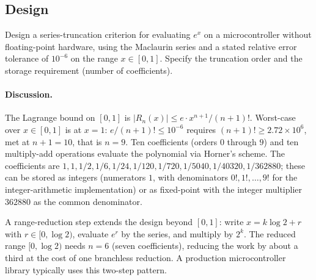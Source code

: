 \subsection*{Design}

\begin{exercise}
Design a series-truncation criterion for evaluating $e^{x}$ on a
microcontroller without floating-point hardware, using the Maclaurin
series and a stated relative error tolerance of $10^{-6}$ on the
range $x \in [0, 1]$. Specify the truncation order and the storage
requirement (number of coefficients).

\paragraph{Discussion.} The Lagrange bound on $[0, 1]$ is
$|R_{n}(x)| \leq e \cdot x^{n+1}/(n+1)!$. Worst-case over $x \in
[0, 1]$ is at $x = 1$: $e/(n+1)! \leq 10^{-6}$ requires $(n+1)!
\geq 2.72 \times 10^{6}$, met at $n + 1 = 10$, that is $n = 9$.
Ten coefficients (orders $0$ through $9$) and ten multiply-add
operations evaluate the polynomial via Horner's scheme. The
coefficients are $1, 1, 1/2, 1/6, 1/24, 1/120, 1/720, 1/5040,
1/40320, 1/362880$; these can be stored as integers (numerators
$1$, with denominators $0!, 1!, \ldots, 9!$ for the integer-arithmetic
implementation) or as fixed-point with the integer multiplier
$362880$ as the common denominator.

A range-reduction step extends the design beyond $[0, 1]$: write
$x = k \log 2 + r$ with $r \in [0, \log 2)$, evaluate $e^{r}$ by
the series, and multiply by $2^{k}$. The reduced range $[0, \log 2)$
needs $n = 6$ (seven coefficients), reducing the work by about a
third at the cost of one branchless reduction. A production
microcontroller library typically uses this two-step pattern.
\end{exercise}

